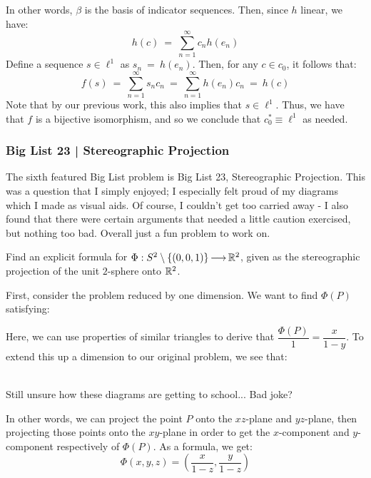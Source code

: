 \begin{soln}
\begin{equation*}
    \end{equation*}
    In other words, $ \beta $ is the basis of indicator sequences. Then, since
    $ h $ linear, we have:
    \begin{equation*}
        h(c) \ = \ \sum_{n=1}^{\infty}c_{n}h(e_{n})
    \end{equation*}
    Define a sequence $ s \in \ell^{1} $ as $ s_{n} \ = \ h(e_{n}) $.
    Then, for any $ c \in c_{0} $, it follows that:
    \begin{equation*}
        f(s) \ = \ \sum_{n=1}^{\infty}s_{n}c_{n} \ = \ \sum_{n=1}^{\infty}
        h(e_{n})c_{n} \ = \ h(c)
    \end{equation*}
    Note that by our previous work, this also implies that $ s \in \ell^{1} $.
    Thus, we have that $ f $ is a bijective isomorphism, and so we conclude that
    $ c_{0}^{*} \equiv \ell^{1} $ as needed.
\end{soln}

\newpage
\subsubsection{Big List 23 | Stereographic Projection}

The sixth featured Big List problem is Big List 23, Stereographic Projection.
This was a question that I simply enjoyed; I especially felt proud of my
diagrams which I made as visual aids. Of course, I couldn't get too carried away
- I also found that there were certain arguments that needed a little caution
exercised, but nothing too bad. Overall just a fun problem to work on.

\begin{qu}[num=23.1]
    Find an explicit formula for $ \Phi : S^{2} \setminus \left\{{(0, 0, 1)}\right\} \operatorname{\longrightarrow}
    \mathbb{R}^{2} $, given as the stereographic projection of the unit $ 2 $-sphere
    onto $ \mathbb{R}^{2} $.
\end{qu}

\begin{soln}
    First, consider the problem reduced by one dimension.
    We want to find $ \Phi(P) $ satisfying:

    \centering
    \flushleft

    Here, we can use properties of similar triangles to derive that
    $ \dfrac{\Phi(P)}{1} = \dfrac{x}{1-y} $.
    To extend this up a dimension to our original problem, we see that:
    
    \centering
     \\
    \small Still unsure how these diagrams are getting to school... Bad joke?
    \flushleft
    
    \normalsize
    In other words, we can project the point $ P $ onto the $ xz $-plane and
    $ yz $-plane, then projecting those points onto the $ xy $-plane in order to
    get the $ x $-component and $ y $-component respectively of $ \Phi(P) $. As
    a formula, we get:
    \begin{equation*}
        \Phi(x, y, z) = \left( \frac{x}{1-z}, \frac{y}{1-z} \right)
    \end{equation*}
\end{soln}

